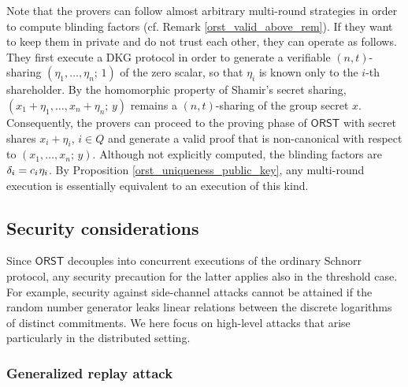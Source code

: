 \documentclass{iacrtrans}
\begin{document}
Note that the provers can follow almost arbitrary
multi-round strategies
in order to compute blinding factors
(cf. Remark \ref{orst_valid_above_rem}).
If they want to keep them
in private and do not trust each other,
they can operate as follows.
They first execute a DKG protocol
in order to generate a verifiable $(n, t)$-sharing
$(\eta_1, \dots, \eta_n;\hspace{2pt} 1)$
of the zero scalar, so that $\eta_i$
is known only to the $i$-th shareholder.
By the homomorphic property of Shamir's secret sharing,
$(x_1 + \eta_1, \dots, x_n + \eta_n;\hspace{2pt} y)$
remains a $(n, t)$-sharing of the group secret $x$.
Consequently,
the provers can proceed to the proving phase of $\mathsf{ORST}$
with secret shares $x_i + \eta_i,\hspace{2pt} i \in Q$
and generate a valid proof that is
non-canonical with respect to $(x_1, \dots, x_n;\hspace{2pt} y)$.
Although not explicitly computed,
the blinding factors are
$\delta_i = c_i\hspace{0.5pt}\eta_i$.
By Proposition \ref{orst_uniqueness_public_key},
any multi-round execution is essentially equivalent
to an execution of this kind.

\subsection{Security considerations}

Since $\mathsf{ORST}$
decouples into concurrent executions
of the ordinary Schnorr protocol, any security precaution
for the latter applies also in the threshold case.
For example, security against side-channel attacks
cannot be attained if the random number generator
leaks linear relations between the discrete logarithms
of distinct commitments.
We here focus on high-level attacks that
arise particularly in the distributed setting.

\subsubsection{Generalized replay attack}\label{section_generalized_replay_attack}
\end{document}
